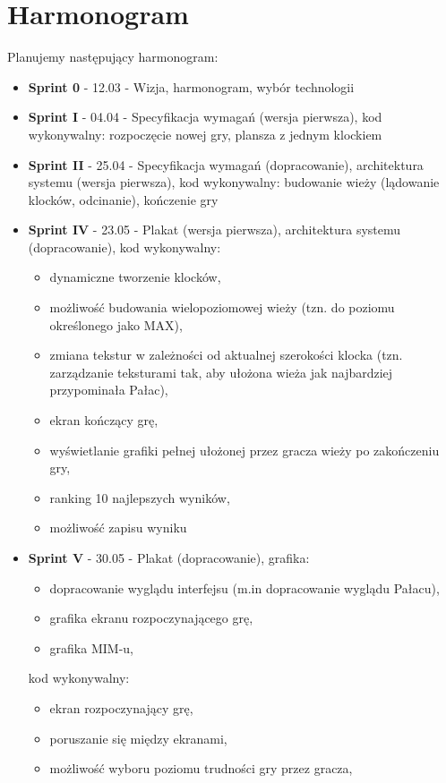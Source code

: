\documentclass{article}
\begin{document}
\section{Harmonogram}
Planujemy następujący harmonogram:
\begin{itemize}
\item\textbf{Sprint 0} - 12.03 - Wizja, harmonogram, wybór technologii
\item\textbf{Sprint I} - 04.04 - Specyfikacja wymagań (wersja pierwsza), kod wykonywalny: rozpoczęcie nowej gry, plansza z jednym klockiem
\item\textbf{Sprint II} - 25.04 - Specyfikacja wymagań (dopracowanie), architektura systemu (wersja pierwsza), kod wykonywalny: budowanie wieży (lądowanie klocków, odcinanie), kończenie gry
\item\textbf{Sprint IV} - 23.05 - Plakat (wersja pierwsza), architektura systemu (dopracowanie), kod wykonywalny: 
  \begin{itemize}
    \item dynamiczne tworzenie klocków,
  \item możliwość budowania wielopoziomowej wieży (tzn. do poziomu określonego jako MAX),
  \item zmiana tekstur w zależności od aktualnej szerokości klocka (tzn. zarządzanie teksturami tak, aby ułożona wieża jak najbardziej przypominała Pałac),
  \item ekran kończący grę,
  \item wyświetlanie grafiki pełnej ułożonej przez gracza wieży po zakończeniu gry,
  \item ranking 10 najlepszych wyników,
  \item możliwość zapisu wyniku
  \end{itemize}
  \item\textbf{Sprint V} - 30.05 - Plakat (dopracowanie), grafika:
    \begin{itemize}
    \item dopracowanie wyglądu interfejsu (m.in dopracowanie wyglądu Pałacu),
      \item grafika ekranu rozpoczynającego grę,
    \item grafika MIM-u,
    \end{itemize}
    kod wykonywalny:
    \begin{itemize}
    \item ekran rozpoczynający grę,
    \item poruszanie się między ekranami,
    \item możliwość wyboru poziomu trudności gry przez gracza,

\end{itemize}
\end{itemize}
\end{document}
